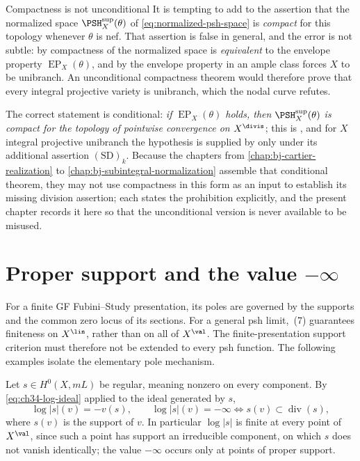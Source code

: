 \begin{warning}{Compactness is not unconditional}
\label{warn:ch34-compactness-conditional}
It is tempting to add to  the assertion that
the normalized space $\PSH_X^{\sup}(\theta)$ of
\eqref{eq:normalized-psh-space} is \emph{compact} for this topology whenever
$\theta$ is nef.  That assertion is false in general, and the error is not
subtle: by  compactness of the normalized
space is \emph{equivalent} to the envelope property
$\operatorname{EP}_X(\theta)$, and by  the
envelope property in an ample class forces $X$ to be unibranch.  An
unconditional compactness theorem would therefore prove that every integral
projective variety is unibranch, which the nodal curve refutes.

The correct statement is conditional:
\emph{if $\operatorname{EP}_X(\theta)$ holds, then
$\PSH_X^{\sup}(\theta)$ is compact for the topology of pointwise
convergence on $X^{\divis}$}; this is
, and for $X$ integral projective
unibranch the hypothesis is supplied by
 only under its additional assertion
$\mathrm{(SD)}_k$. Because the chapters from
\cref{chap:bj-cartier-realization} to \cref{chap:bj-subintegral-normalization}
assemble that conditional theorem, they may not use compactness in this form
as an input to establish its missing division assertion; each states
the prohibition explicitly, and the present chapter records it here so that
the unconditional version is never available to be misused.
\end{warning}

\section{Proper support and the value \texorpdfstring{$-\infty$}{-infinity}}
\label{sec:ch34-proper-support}

For a finite GF Fubini--Study presentation, its poles are governed by
the supports and the common zero locus of its sections.  For a general
psh limit, \,(7) guarantees finiteness on
$X^{\lin}$, rather than on all of $X^{\val}$.
The finite-presentation support criterion must therefore not be
extended to every psh function.  The following examples isolate the
elementary pole mechanism.

Let $s\in H^0(X,mL)$ be regular, meaning nonzero on every component.  By \eqref{eq:ch34-log-ideal} applied to the
ideal generated by $s$,
\begin{equation}
\label{eq:divisor-section-pole}
 \log|s|(v)=-v(s),
 \qquad
 \log|s|(v)=-\infty
 \iff
 s(v)\subset\operatorname{div}(s),
\end{equation}
where $s(v)$ is the support of $v$.  In particular $\log|s|$ is finite
at every point of $X^{\val}$, since such a point has support an
irreducible component, on which $s$ does not vanish identically; the
value $-\infty$ occurs only at points of proper support.

